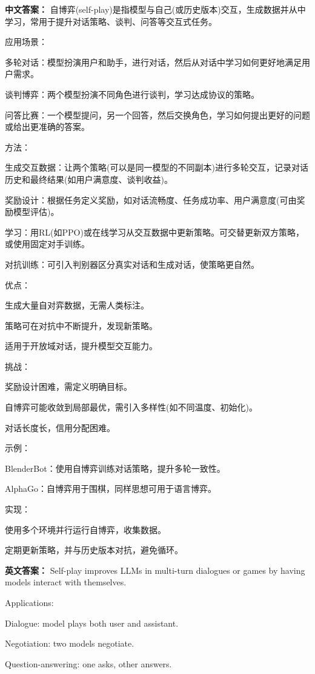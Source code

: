 \documentclass[10pt,a4paper]{ctexart}
\begin{document}
\textbf{中文答案：}
自博弈(self-play)是指模型与自己(或历史版本)交互，生成数据并从中学习，常用于提升对话策略、谈判、问答等交互式任务。

应用场景：

多轮对话：模型扮演用户和助手，进行对话，然后从对话中学习如何更好地满足用户需求。

谈判博弈：两个模型扮演不同角色进行谈判，学习达成协议的策略。

问答比赛：一个模型提问，另一个回答，然后交换角色，学习如何提出更好的问题或给出更准确的答案。

方法：

生成交互数据：让两个策略(可以是同一模型的不同副本)进行多轮交互，记录对话历史和最终结果(如用户满意度、谈判收益)。

奖励设计：根据任务定义奖励，如对话流畅度、任务成功率、用户满意度(可由奖励模型评估)。

学习：用RL(如PPO)或在线学习从交互数据中更新策略。可交替更新双方策略，或使用固定对手训练。

对抗训练：可引入判别器区分真实对话和生成对话，使策略更自然。

优点：

生成大量自对弈数据，无需人类标注。

策略可在对抗中不断提升，发现新策略。

适用于开放域对话，提升模型交互能力。

挑战：

奖励设计困难，需定义明确目标。

自博弈可能收敛到局部最优，需引入多样性(如不同温度、初始化)。

对话长度长，信用分配困难。

示例：

BlenderBot：使用自博弈训练对话策略，提升多轮一致性。

AlphaGo：自博弈用于围棋，同样思想可用于语言博弈。

实现：

使用多个环境并行运行自博弈，收集数据。

定期更新策略，并与历史版本对抗，避免循环。

\textbf{英文答案：}
Self-play improves LLMs in multi-turn dialogues or games by having models interact with themselves.

Applications:

Dialogue: model plays both user and assistant.

Negotiation: two models negotiate.

Question-answering: one asks, other answers.
\end{document}
